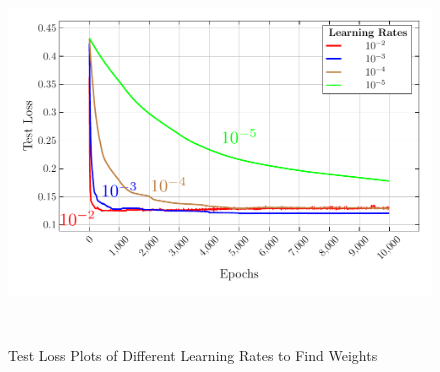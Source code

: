 \documentclass[12pt]{article}
\begin{document}
    \begin{figure}[!htbp]
        \centering
        \includegraphics[width=16cm, height=10cm]{test_losses_diff_lr_plot}
        \caption{Test Loss Plots of Different Learning Rates to Find Weights}
        \label{fig:Test Loss Plots of Different Learning Rates to Find Weights}
    \end{figure}
\end{document}
